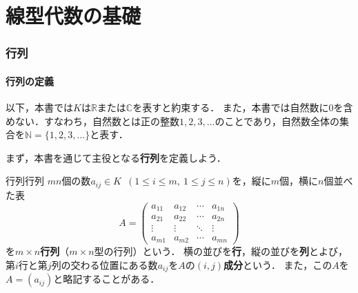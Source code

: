 \part{線型代数の基礎}

\begin{abstract}
  この章では，線型代数の基礎となる用語や概念を整理する．
  まず行列を定義し，その和・スカラー倍・積といった計算規則と逆行列について確認する．
  次に，行列を用いた連立一次方程式の取り扱いを見る．
  そのうえで線型写像を定義し，$K^n$から$K^m$への線型写像が$m \times n$行列とちょうど一対一に対応することを示す．
  また，線型写像に付随する基本的な集合として，像と核を導入する．
  最後に線型結合を定義し，「線型独立」「線型従属」の概念および行列の階数を導入する．
\end{abstract}

\section{行列}

\subsection{行列の定義}

以下，本書では$K$は$\mathbb{R}$または$\mathbb{C}$を表すと約束する．
また，本書では自然数に$0$を含めない．すなわち，自然数とは正の整数$1, 2, 3, \dots$のことであり，自然数全体の集合を$\mathbb{N} = \{1, 2, 3, \dots\}$と表す．

まず，本書を通じて主役となる\textbf{行列}を定義しよう．

\begin{definition}{行列}{行列}
  $mn$個の数$a_{ij} \in K$~$(1 \le i \le m,~1 \le j \le n)$を，縦に$m$個，横に$n$個並べた表
  \[
    A =
    \begin{pmatrix}
      a_{11} & a_{12} & \cdots & a_{1n} \\
      a_{21} & a_{22} & \cdots & a_{2n} \\
      \vdots & \vdots & \ddots & \vdots \\
      a_{m1} & a_{m2} & \cdots & a_{mn}
    \end{pmatrix}
  \]
  を\textbf{$m \times n$行列}（$m \times n$型の行列）という．
  横の並びを\textbf{行}，縦の並びを\textbf{列}とよび，第$i$行と第$j$列の交わる位置にある数$a_{ij}$を$A$の\textbf{$(i, j)$成分}という．
  また，この$A$を$A = (a_{ij})$と略記することがある．
\end{definition}

